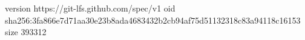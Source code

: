 version https://git-lfs.github.com/spec/v1
oid sha256:3fa866e7d71aa30e23b8ada4683432b2cb94af75d51132318c83a94118c16153
size 393312
